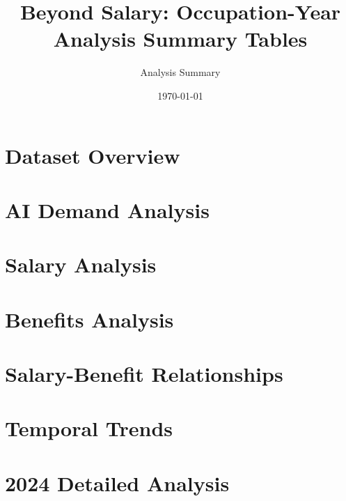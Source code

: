 \documentclass{article}
\title{Beyond Salary: Occupation-Year Analysis Summary Tables}
\author{Analysis Summary}
\date{\today}
\begin{document}
\maketitle

\section{Dataset Overview}


\section{AI Demand Analysis}


\section{Salary Analysis}


\section{Benefits Analysis}



\section{Salary-Benefit Relationships}




\section{Temporal Trends}



\section{2024 Detailed Analysis}



\end{document}

